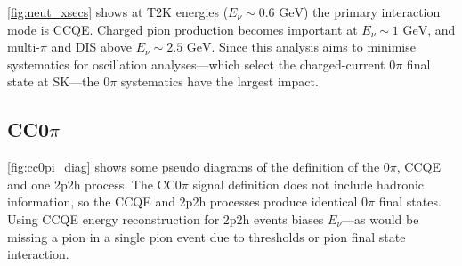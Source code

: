 \autoref{fig:neut_xsecs} shows at T2K energies ($E_\nu\sim0.6\text{ GeV}$) the primary interaction mode is CCQE. Charged pion production becomes important at $E_\nu\sim1\text{ GeV}$, and multi-$\pi$ and DIS above $E_\nu\sim2.5\text{ GeV}$. Since this analysis aims to minimise systematics for oscillation analyses---which select the charged-current 0$\pi$ final state at SK---the 0$\pi$ systematics have the largest impact.

\subsection{CC0$\pi$}
\autoref{fig:cc0pi_diag} shows some pseudo diagrams of the definition of the 0$\pi$, CCQE and one 2p2h process. The CC0$\pi$ signal definition does not include hadronic information, so the CCQE and 2p2h processes produce identical 0$\pi$ final states. Using CCQE energy reconstruction for 2p2h events biases $E_\nu$---as would be missing a pion in a single pion event due to thresholds or pion final state interaction.
